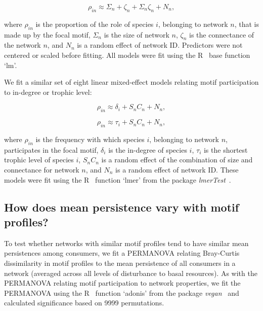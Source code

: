 \documentclass[12pt]{article}
\begin{document}
\begin{spacing}{2.0}
        \begin{equation}
            \rho_{in} \approx \Sigma_{n} + \zeta_{n} + \Sigma_{n}\zeta_{n} + N_n ,
            \label{partic_SC}
        \end{equation}
        
        \noindent where $\rho_{in}$ is the proportion of the role of species $i$, belonging to network $n$, that is made up by the focal motif,
        $\Sigma_{n}$ is the size of network $n$, $\zeta_{n}$ is the connectance of the network $n$, and $N_n$ is a random effect of network ID.
        Predictors were not centered or scaled before fitting.
        All models were fit using the R~\citep{R} base function `lm'.

       
        We fit a similar set of eight linear mixed-effect models relating motif participation to in-degree or trophic level:
        
        \begin{equation}
            \rho_{in} \approx \delta_{i} + S_{n}C_{n} + N_n,
            \label{partic_deg}
        \end{equation}

        \begin{equation}
            \rho_{in} \approx \tau_{i} + S_{n}C_{n} + N_n,
            \label{partic_tl}
        \end{equation}
        
        \noindent where $\rho_{in}$ is the frequency with which species $i$, belonging to network $n$, participates in the focal motif, $\delta_{i}$ is the in-degree of species $i$, $\tau_{i}$ is the shortest trophic level of species $i$, $S_{n}C_{n}$ is a random effect of the combination of size and connectance for network $n$, and $N_n$ is a random effect of network ID.
        These models were fit using the R~\citep{R} function `lmer' from the package \emph{lmerTest}~\citep{lmerTest}.

    		
    \subsection{How does mean persistence vary with motif profiles?}

        To test whether networks with similar motif profiles tend to have similar mean persistences among consumers, we fit a PERMANOVA relating Bray-Curtis dissimilarity in motif profiles to the mean persistence of all consumers in a network (averaged across all levels of disturbance to basal resources).
        As with the PERMANOVA relating motif participation to network properties, we fit the PERMANOVA using the R~\citep{R} function `adonis' from the package \emph{vegan}~\citep{vegan} and calculated significance based on 9999 permutations.



\end{spacing}
\end{document}
